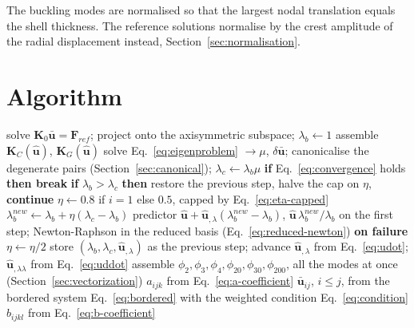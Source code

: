 \documentclass[11pt,a4paper]{article}
\begin{document}
The buckling modes are normalised so that the largest nodal translation
equals the shell thickness.  The reference solutions normalise by the crest
amplitude of the radial displacement instead, Section~\ref{sec:normalisation}.

\section{Algorithm}

\begin{algorithm}[H]
\caption{Koiter analysis about a non-linear pre-buckling state}
\begin{algorithmic}[1]
\State solve $\boldsymbol{K}_0\boldsymbol{\bar{u}} = \boldsymbol{F}_{ref}$;
       project onto the axisymmetric subspace; $\lambda_b \gets 1$
  \State assemble $\boldsymbol{K}_C(\boldsymbol{\hat{u}})$,
         $\boldsymbol{K}_G(\boldsymbol{\hat{u}})$
  \State solve Eq.~\ref{eq:eigenproblem} $\rightarrow \mu$,
         $\delta\boldsymbol{\bar{u}}$; canonicalise the degenerate pairs
         (Section~\ref{sec:canonical}); \quad $\lambda_c \gets \lambda_b\mu$
  \State \textbf{if} Eq.~\ref{eq:convergence} holds \textbf{then break}
  \State \textbf{if} $\lambda_b > \lambda_c$ \textbf{then} restore the
         previous step, halve the cap on $\eta$, \textbf{continue}
  \State $\eta \gets 0.8$ if $i=1$ else $0.5$, capped by
         Eq.~\ref{eq:eta-capped}
  \Repeat
    \State $\lambda_b^{new} \gets \lambda_b + \eta(\lambda_c-\lambda_b)$
    \State predictor $\boldsymbol{\hat{u}} +
           \boldsymbol{\hat{u}}_{,\lambda}(\lambda_b^{new}-\lambda_b)$,
           $\boldsymbol{\hat{u}}\,\lambda_b^{new}/\lambda_b$ on the first
           step;
           Newton-Raphson in the reduced basis
           (Eq.~\ref{eq:reduced-newton})
    \State \textbf{on failure} $\eta \gets \eta/2$
  \State store $(\lambda_b,\lambda_c,\boldsymbol{\hat{u}}_{,\lambda})$ as the
         previous step; advance
\EndFor
\State $\boldsymbol{\hat{u}}_{,\lambda}$ from Eq.~\ref{eq:udot};
       $\boldsymbol{\hat{u}}_{,\lambda\lambda}$ from Eq.~\ref{eq:uddot}
\State assemble $\phi_2,\phi_3,\phi_4,\phi_{20},\phi_{30},\phi_{200}$,
       all the modes at once (Section~\ref{sec:vectorization})
\State $a_{ijk}$ from Eq.~\ref{eq:a-coefficient}
\State $\boldsymbol{\bar{u}}_{ij}$, $i \le j$, from the bordered system
       Eq.~\ref{eq:bordered} with the weighted condition
       Eq.~\ref{eq:condition}
\State $b_{ijkl}$ from Eq.~\ref{eq:b-coefficient}
\end{algorithmic}
\end{algorithm}
\end{document}
